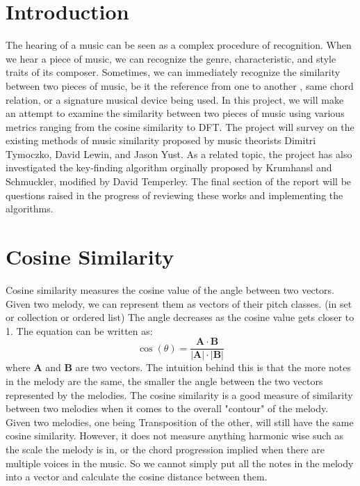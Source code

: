 \documentclass[12pt]{report}
\theoremstyle{definition}
\begin{document}
\maketitle

\setcounter{MaxMatrixCols}{20} \setlength\parindent{0pt}

\section{Introduction}
The hearing of a music can be seen as a complex procedure of recognition. 
When we hear a piece of music, we can recognize the genre, characteristic, and 
style traits of its composer. Sometimes, we can immediately recognize
the similarity between two pieces of music, be it the reference from one to another
, same chord relation, or a signature musical device being used. In this project, 
we will make an attempt to examine the similarity between two pieces of music using 
various metrics ranging from the cosine similarity to DFT. The project will
survey on the existing methods of music similarity proposed by music theorists
Dimitri Tymoczko, David Lewin, and Jason Yust. As a related topic, the project has also
investigated the key-finding algorithm orginally proposed by Krumhansl and Schmuckler, 
modified by David Temperley. The final section of the report will be questions raised 
in the progress of reviewing these works and implementing the algorithms.

\section{Cosine Similarity}
Cosine similarity measures the cosine value of the angle between two vectors.
Given two melody, we can represent them as vectors of their pitch classes. (in set or
collection or ordered list) The angle decreases as the cosine value gets closer to 
1. The equation can be written as:
\[\cos(\theta) = \frac{\mathbf{A}\cdot\mathbf{B}}{|\mathbf{A}|\cdot|\mathbf{B}|}\]
where $\mathbf{A}$ and $\mathbf{B}$ are two vectors. The intuition behind this is that
the more notes in the melody are the same, the smaller the angle between the two vectors represented
by the melodies. The cosine similarity is a good measure of similarity between two melodies when it comes to
the overall "contour" of the melody. Given two melodies, one being Transposition of the other,
will still have the same cosine similarity. However, it does not measure anything harmonic wise
such as the scale the melody is in, or the chord progression implied when there are multiple voices
in the music. So we cannot simply put all the notes in the melody into a vector and calculate the cosine
distance between them.
\end{document}
